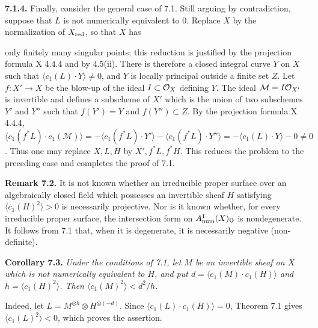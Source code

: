 \textbf{7.1.4.} Finally, consider the general case of 7.1. Still arguing by contradiction, suppose that $L$ is not numerically equivalent to $0$. Replace $X$ by the normalization of $X_{\mathrm{red}}$, so that $X$ has

only finitely many singular points; this reduction is justified by the projection formula X 4.4.4 and by 4.5(ii). There is therefore a closed integral curve $Y$ on $X$ such that
$\langle c_1(L)\cdot Y\rangle\ne0$, and $Y$ is locally principal
outside a finite set $Z$. Let $f:X'\to X$ be the blow-up of the ideal
$I\subset\mathcal O_X$ defining $Y$. The ideal $\mathcal M=I\mathcal O_{X'}$ is
invertible and defines a subscheme of $X'$ which is the union of two
subschemes $Y'$ and $Y''$ such that $f(Y')=Y$ and $f(Y'')\subset Z$.
By the projection formula X 4.4.4,
$\langle c_1(f^*L)\cdot c_1(\mathcal M)\rangle
=-\langle c_1(f^*L)\cdot Y'\rangle
-\langle c_1(f^*L)\cdot Y''\rangle
=-\langle c_1(L)\cdot Y\rangle-0\ne0$. Thus one may replace $X,L,H$
by $X',f^*L,f^*H$. This reduces the problem to the preceding case and
completes the proof of 7.1.

\textbf{Remark 7.2.} It is not known whether an irreducible proper surface over an algebraically closed field which possesses an invertible sheaf $H$ satisfying $\langle c_1(H)^2\rangle>0$ is necessarily projective. Nor is it known whether, for every irreducible proper surface, the intersection form on $A^1_{\mathrm{num}}(X)_{\mathbb Q}$ is nondegenerate. It follows from 7.1 that, when it is degenerate, it is necessarily negative (non-definite).

\textbf{Corollary 7.3.} \emph{Under the conditions of 7.1, let $M$ be
an invertible sheaf on $X$ which is not numerically equivalent to $H$,
and put $d=\langle c_1(M)\cdot c_1(H)\rangle$ and
$h=\langle c_1(H)^2\rangle$. Then
$\langle c_1(M)^2\rangle<d^2/h$.}

Indeed, let $L=M^{\otimes h}\otimes H^{\otimes(-d)}$. Since
$\langle c_1(L)\cdot c_1(H)\rangle=0$, Theorem 7.1 gives
$\langle c_1(L)^2\rangle<0$, which proves the assertion.

